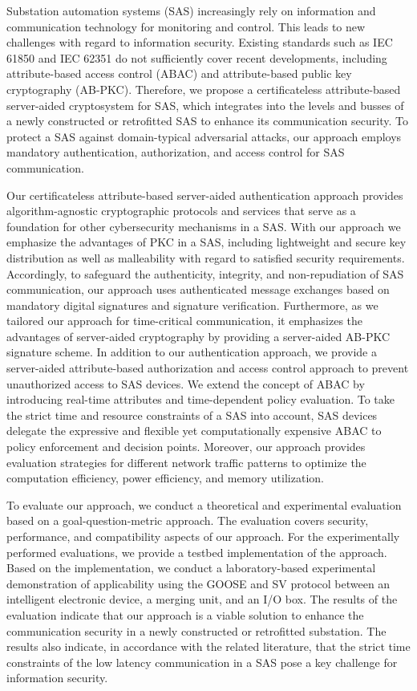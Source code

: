 \Abstract
Substation automation systems (SAS) increasingly rely on information and communication technology for monitoring and control.
This leads to new challenges with regard to information security.
Existing standards such as IEC 61850 and IEC 62351 do not sufficiently cover recent developments, including attribute-based access control (ABAC) and attribute-based public key cryptography (AB-PKC).
Therefore, we propose a certificateless attribute-based server-aided cryptosystem for SAS, which integrates into the levels and busses of a newly constructed or retrofitted SAS to enhance its communication security.
To protect a SAS against domain-typical adversarial attacks, our approach employs mandatory authentication, authorization, and access control for SAS communication.

Our certificateless attribute-based server-aided authentication approach provides algorithm-agnostic cryptographic protocols and services that serve as a foundation for other cybersecurity mechanisms in a SAS.
With our approach we emphasize the advantages of PKC in a SAS, including lightweight and secure key distribution as well as malleability with regard to satisfied security requirements.
Accordingly, to safeguard the authenticity, integrity, and non-repudiation of SAS communication, our approach uses authenticated message exchanges based on mandatory digital signatures and signature verification.
Furthermore, as we tailored our approach for time-critical communication, it emphasizes the advantages of server-aided cryptography by providing a server-aided AB-PKC signature scheme.
In addition to our authentication approach, we provide a server-aided attribute-based authorization and access control approach to prevent unauthorized access to SAS devices.
We extend the concept of ABAC by introducing real-time attributes and time-dependent policy evaluation.
To take the strict time and resource constraints of a SAS into account, SAS devices delegate the expressive and flexible yet computationally expensive ABAC to policy enforcement and decision points.
Moreover, our approach provides evaluation strategies for different network traffic patterns to optimize the computation efficiency, power efficiency, and memory utilization.

To evaluate our approach, we conduct a theoretical and experimental evaluation based on a goal-question-metric approach.
The evaluation covers security, performance, and compatibility aspects of our approach.
For the experimentally performed evaluations, we provide a testbed implementation of the approach.
Based on the implementation, we conduct a laboratory-based experimental demonstration of applicability using the GOOSE and SV protocol between an intelligent electronic device, a merging unit, and an I/O box.
The results of the evaluation indicate that our approach is a viable solution to enhance the communication security in a newly constructed or retrofitted substation.
The results also indicate, in accordance with the related literature, that the strict time constraints of the low latency communication in a SAS pose a key challenge for information security.
